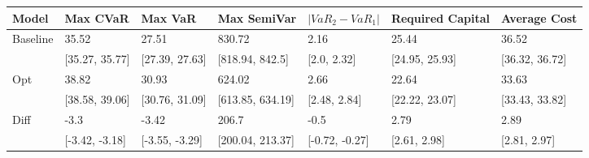 \begin{tabular}{lllllll}
\toprule
   Model &       Max CVaR &        Max VaR &      Max SemiVar & $|VaR_2 - VaR_1|$ & Required Capital &   Average Cost \\
\midrule
Baseline &          35.52 &          27.51 &           830.72 &              2.16 &            25.44 &          36.52 \\
         & [35.27, 35.77] & [27.39, 27.63] &  [818.94, 842.5] &       [2.0, 2.32] &   [24.95, 25.93] & [36.32, 36.72] \\
     Opt &          38.82 &          30.93 &           624.02 &              2.66 &            22.64 &          33.63 \\
         & [38.58, 39.06] & [30.76, 31.09] & [613.85, 634.19] &      [2.48, 2.84] &   [22.22, 23.07] & [33.43, 33.82] \\
    Diff &           -3.3 &          -3.42 &            206.7 &              -0.5 &             2.79 &           2.89 \\
         & [-3.42, -3.18] & [-3.55, -3.29] & [200.04, 213.37] &    [-0.72, -0.27] &     [2.61, 2.98] &   [2.81, 2.97] \\
\bottomrule
\end{tabular}
